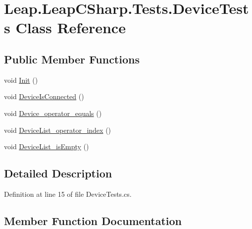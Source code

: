\hypertarget{class_leap_1_1_leap_c_sharp_1_1_tests_1_1_device_tests}{}\section{Leap.\+Leap\+C\+Sharp.\+Tests.\+Device\+Tests Class Reference}
\label{class_leap_1_1_leap_c_sharp_1_1_tests_1_1_device_tests}
\subsection*{Public Member Functions}
\begin{DoxyCompactItemize}
\item 
void \mbox{\hyperlink{class_leap_1_1_leap_c_sharp_1_1_tests_1_1_device_tests_aee6d06d56c20ca05626ebc04fb5985a1}{Init}} ()
\item 
void \mbox{\hyperlink{class_leap_1_1_leap_c_sharp_1_1_tests_1_1_device_tests_aa1d40f9bbc350ccc7e003e49883a0d1f}{Device\+Is\+Connected}} ()
\item 
void \mbox{\hyperlink{class_leap_1_1_leap_c_sharp_1_1_tests_1_1_device_tests_acc5b8bbfb6f29a85f76cb87407838103}{Device\+\_\+operator\+\_\+equals}} ()
\item 
void \mbox{\hyperlink{class_leap_1_1_leap_c_sharp_1_1_tests_1_1_device_tests_a9dc5ad55e1adbd17abdbc27dce3786d8}{Device\+List\+\_\+operator\+\_\+index}} ()
\item 
void \mbox{\hyperlink{class_leap_1_1_leap_c_sharp_1_1_tests_1_1_device_tests_abd312ecfe440abcd449bb3309d45dc9f}{Device\+List\+\_\+is\+Empty}} ()
\end{DoxyCompactItemize}


\subsection{Detailed Description}


Definition at line 15 of file Device\+Tests.\+cs.



\subsection{Member Function Documentation}
\mbox{\label{class_leap_1_1_leap_c_sharp_1_1_tests_1_1_device_tests_acc5b8bbfb6f29a85f76cb87407838103}} 

